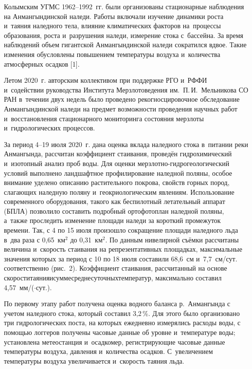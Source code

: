 Колымским УГМС 1962--1992~гг. были организованы стационарные наблюдения на Анмангындинской наледи. Работы включали изучение динамики роста и~таяния наледного тела, влияние климатических факторов на~процессы образования, роста и~разрушения наледи, измерение стока с~бассейна. За время наблюдений объем гигантской Анмангындинской наледи сократился вдвое. Такие изменения обусловлены повышением температуры воздуха и~количества атмосферных осадков [1].

Летом 2020~г. авторским коллективом при поддержке РГО и~РФФИ и~содействии руководства Института Мерзлотоведения им.~П.\,И.~Мельникова СО РАН в~течении двух недель было проведено рекогносцировочное обследование Анмангындинской наледи на предмет возможности проведения научных работ и~восстановления стационарного мониторинга состояния мерзлоты и~гидрологических процессов.

За период 4--19 июля 2020~г. дана оценка вклада наледного стока в~питании реки Анмангында, рассчитан коэффициент стаивания, проведён гидрохимический и~изотопный анализ проб воды. Для оценки мерзлотно-гидрогеологический условий выполнено ландшафтное профилирование наледной поляны, особое внимание уделено описанию растительного покрова, свойств горных пород, слагающих наледную поляну и~геокриологическим явлениям. Использование современного оборудования, такого как беспилотный летательный аппарат (БПЛА) позволило составить подробный ортофотоплан наледной поляны, а~также проследить изменение площади наледи за короткий промежуток времени. Так, с 4 по 15 июля произошло сокращение площади наледного льда в~два раза с 0,65~км$^2$ до 0,31~км$^2$. По данным нивелирной съёмки рассчитаны величина и~скорость стаивания на репрезентативных площадках, максимальные значения которых за период с 10 по 18 июля составили 68,6~см и~7,7~см/сут. соответственно (рис.~2). Коэффициент стаивания, рассчитанный на основе скорости\;\;таяния\;\;и\;\;сумме\;\;среднесуточных\;\;температур, максимально составил 4,57~мм/(\dgc$\cdot$сут.).



По первому этапу работ получена оценка водного баланса р.~Анмангында с учетом наледного стока, который составил 3,2\,\%. Для этого было организовано три гидрологических поста, на которых ежедневно измерялись расходы воды, с помощью логгеров получены часовые данные об уровне и~температуре воды; установлена метеостанция и~осадкомер, регистрирующие часовые данные температуры воздуха, давления и~количества осадков. С~увеличением температуры воздуха увеличивается и~скорость таяния льда.

